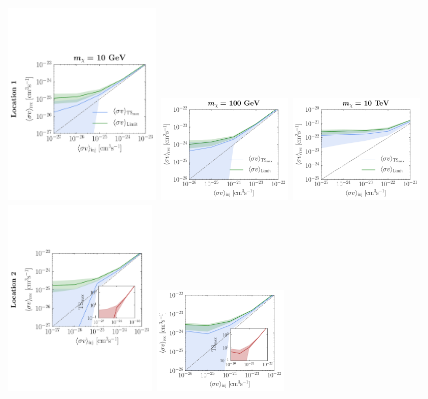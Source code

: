\begin{figure}[t]
   \centering
   \includegraphics[width=0.35\textwidth]{ch-darksky/plots//signal_recovery_10GeV} \hspace{0.01cm}
   \includegraphics[width=0.30\textwidth]{ch-darksky/plots//signal_recovery_100GeV} \hspace{0.01cm} 
   \includegraphics[width=0.30\textwidth]{ch-darksky/plots//signal_recovery_10TeV} \\ \vspace{0.01cm}  
   \includegraphics[width=0.34\textwidth]{ch-darksky/plots//signal_recovery_10GeV_loc2} \hspace{0.01cm}
   \includegraphics[width=0.30\textwidth]{ch-darksky/plots//signal_recovery_100GeV_loc2} \hspace{0.01cm} 

\end{figure}

